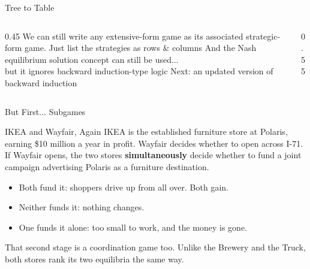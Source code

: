 \begin{frame}{Tree to Table}
\begin{columns}[T]
    \begin{column}{0.45\textwidth}
        We can still write any extensive-form game as its associated strategic-form game.
        \bsk
        Just list the strategies as rows \& columns
        \bsk
        And the Nash equilibrium solution concept can still be used...\\
        but it ignores backward induction-type logic
        \bsk
        Next: an updated version of backward induction
    \end{column}
    \begin{column}{0.55\textwidth}
        \begin{matrixgame}[top={Frkltn, ShrtNrth}, left={Stay Frkltn, Stay ShrtNrth,Expand Frkltn,Expand ShrtNrth}, player names={Brewery, Food Truck}, br]
        \end{matrixgame}
    \end{column}
\end{columns}
\end{frame}


\begin{frame}[standout]
But First... Subgames
\end{frame}

\begin{frame}{IKEA and Wayfair, Again}
IKEA is the established furniture store at Polaris, earning \$10 million a year
in profit. Wayfair decides whether to open across I-71.
\bsk
If Wayfair opens, the two stores \textbf{simultaneously} decide whether to fund a
joint campaign advertising Polaris as a furniture destination.
\begin{itemize}
    \item Both fund it: shoppers drive up from all over. Both gain.
    \item Neither funds it: nothing changes.
    \item One funds it alone: too small to work, and the money is gone.
\end{itemize}
\bsk
\vfill
That second stage is a coordination game too. Unlike the Brewery and the
Truck, both stores rank its two equilibria the same way.
\vspace{-0.3in}
\end{frame}

